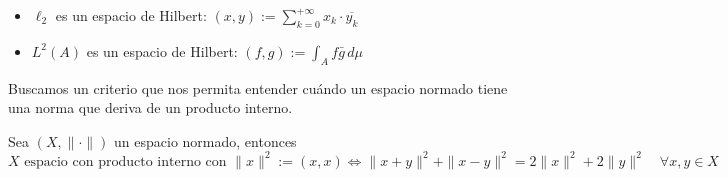 \begin{ejemplo}
    \begin{itemize}
        \item $\ell_2$ es un espacio de Hilbert: $(x, y) := \sum_{k=0}^{+\infty} x_k \cdot \overline{y_k}$
        \item $L^2(A)$ es un espacio de Hilbert: $(f, g) := \int_A f \bar{g} \, d\mu$
    \end{itemize}
\end{ejemplo}

\noindent
Buscamos un criterio que nos permita entender cuándo un espacio normado tiene una norma que deriva de un producto interno.

\begin{teo}\label{teo:paralelogramo}
    Sea $(X, \|\cdot\|)$ un espacio normado, entonces
    \begin{equation*}
        X \text{ espacio con producto interno con } \|x\|^2 := (x, x) \iff \|x+y\|^2 + \|x-y\|^2 = 2\|x\|^2 + 2\|y\|^2 \quad \forall x, y \in X
    \end{equation*}


\end{teo}
